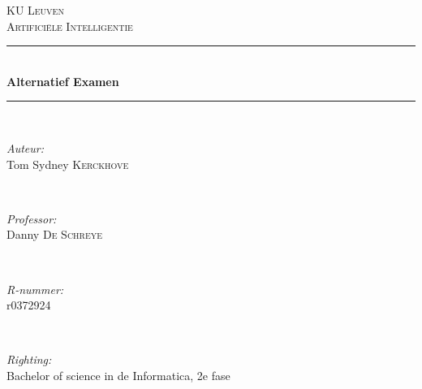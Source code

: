\documentclass[10pt]{report}
\begin{document}
\begin{titlepage}


\thispagestyle{empty} %


\newcommand{\HRule}{\rule{\linewidth}{0.5mm}} %

\center %
 

\textsc{\LARGE KU Leuven}\\[1.5cm] %
\textsc{\Large Artifici\"ele Intelligentie}\\[0.5cm] %


\HRule \\[0.4cm]
{ \Huge \bfseries Alternatief Examen}\\
\HRule \\[2cm]
 

\begin{minipage}{0.4\textwidth}
\begin{flushleft} \large
\emph{Auteur:}\\
Tom Sydney \textsc{Kerckhove} %
\end{flushleft}
\end{minipage}
~
\begin{minipage}{0.4\textwidth}
\begin{flushright} \large
\emph{Professor:} \\
Danny \textsc{De Schreye} %
\end{flushright}
\end{minipage}\\[1cm]

\begin{minipage}{0.4\textwidth}
\begin{flushleft} \large
\emph{R-nummer:}\\
r0372924 %
\end{flushleft}
\end{minipage}
~
\begin{minipage}{0.4\textwidth}
\begin{flushright} \large
\emph{Righting:} \\
Bachelor of science in de Informatica, 2e fase %
\end{flushright}
\end{minipage}


\end{titlepage}
\end{document}
